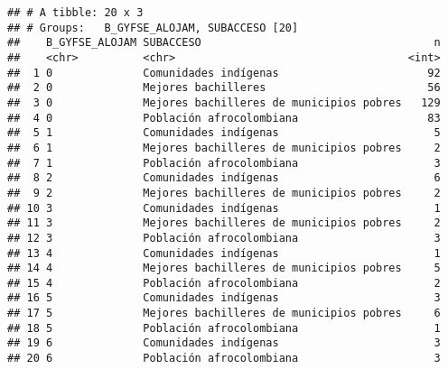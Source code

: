 \documentclass[]{article}
\theoremstyle{definition}
\theoremstyle{definition}
\theoremstyle{definition}
\theoremstyle{remark}
\begin{document}
\begin{verbatim}
## # A tibble: 20 x 3
## # Groups:   B_GYFSE_ALOJAM, SUBACCESO [20]
##    B_GYFSE_ALOJAM SUBACCESO                                    n
##    <chr>          <chr>                                    <int>
##  1 0              Comunidades indígenas                       92
##  2 0              Mejores bachilleres                         56
##  3 0              Mejores bachilleres de municipios pobres   129
##  4 0              Población afrocolombiana                    83
##  5 1              Comunidades indígenas                        5
##  6 1              Mejores bachilleres de municipios pobres     2
##  7 1              Población afrocolombiana                     3
##  8 2              Comunidades indígenas                        6
##  9 2              Mejores bachilleres de municipios pobres     2
## 10 3              Comunidades indígenas                        1
## 11 3              Mejores bachilleres de municipios pobres     2
## 12 3              Población afrocolombiana                     3
## 13 4              Comunidades indígenas                        1
## 14 4              Mejores bachilleres de municipios pobres     5
## 15 4              Población afrocolombiana                     2
## 16 5              Comunidades indígenas                        3
## 17 5              Mejores bachilleres de municipios pobres     6
## 18 5              Población afrocolombiana                     1
## 19 6              Comunidades indígenas                        3
## 20 6              Población afrocolombiana                     3
\end{verbatim}
\end{document}
